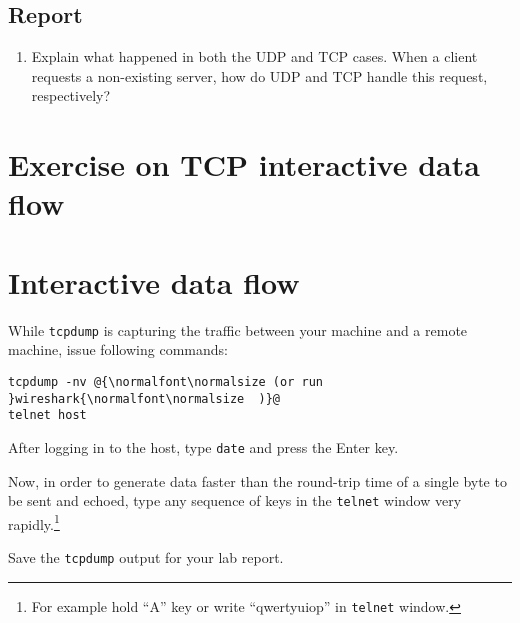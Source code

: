 \documentclass{../UTNetLab}
\begin{document}
    \subsection*{Report}
    \begin{enumerate}
        \item Explain what happened in both the UDP and TCP cases. When a client requests a non-existing server, how do UDP and TCP handle this request, respectively?
    \end{enumerate}

\section*{Exercise on TCP interactive data flow}
\section{Interactive data flow}
While \lstinline{tcpdump} is capturing the traffic between your machine and a remote machine, issue following commands:
    \begin{lstlisting}[emph={host}]
tcpdump -nv @{\normalfont\normalsize (or run }wireshark{\normalfont\normalsize  )}@
telnet host
    \end{lstlisting}
    After logging in to the host, type \lstinline{date} and press the {Enter} key.

    Now, in order to generate data faster than the round-trip time of a single byte to be sent and echoed, type any sequence of keys in the \lstinline{telnet} window very rapidly.\footnote{For example hold ``A'' key or write ``qwertyuiop'' in \lstinline{telnet} window.}

    {Save} the \lstinline{tcpdump} output for your lab report.
    
\end{document}
